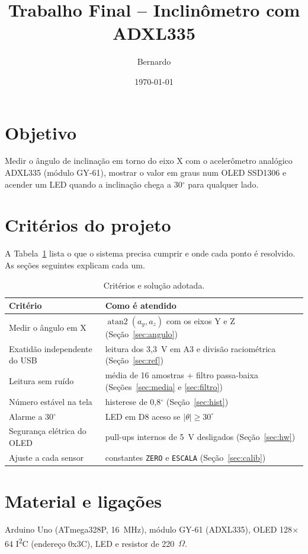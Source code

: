 \documentclass[11pt,a4paper]{article}
\title{Trabalho Final -- Inclinômetro com ADXL335}
\author{Bernardo}
\date{\today}
\begin{document}
\maketitle

\section{Objetivo}
Medir o ângulo de inclinação em torno do eixo X com o acelerômetro
analógico ADXL335 (módulo GY-61), mostrar o valor em graus num OLED
SSD1306 e acender um LED quando a inclinação chega a 30$^\circ$ para
qualquer lado.

\section{Critérios do projeto}
A Tabela~\ref{tab:criterios} lista o que o sistema precisa cumprir e
onde cada ponto é resolvido. As seções seguintes explicam cada um.

\begin{table}[h]
\centering
\begin{tabularx}{\textwidth}{>{\raggedright}p{4.2cm}X}
\toprule
Critério & Como é atendido \\
\midrule
Medir o ângulo em X & $\operatorname{atan2}(a_y, a_z)$ com os eixos Y e Z
  (Seção~\ref{sec:angulo}) \\
Exatidão independente do USB & leitura dos 3,3~V em A3 e divisão
  raciométrica (Seção~\ref{sec:ref}) \\
Leitura sem ruído & média de 16 amostras + filtro passa-baixa
  (Seções~\ref{sec:media} e \ref{sec:filtro}) \\
Número estável na tela & histerese de 0,8$^\circ$ (Seção~\ref{sec:hist}) \\
Alarme a 30$^\circ$ & LED em D8 aceso se $|\theta| \ge 30^\circ$ \\
Segurança elétrica do OLED & pull-ups internos de 5~V desligados
  (Seção~\ref{sec:hw}) \\
Ajuste a cada sensor & constantes \texttt{ZERO} e \texttt{ESCALA}
  (Seção~\ref{sec:calib}) \\
\bottomrule
\end{tabularx}
\caption{Critérios e solução adotada.}
\label{tab:criterios}
\end{table}

\section{Material e ligações}
Arduino Uno (ATmega328P, 16~MHz), módulo GY-61 (ADXL335), OLED
128$\times$64 I\textsuperscript{2}C (endereço 0x3C), LED e resistor de
220~$\Omega$.
\end{document}
